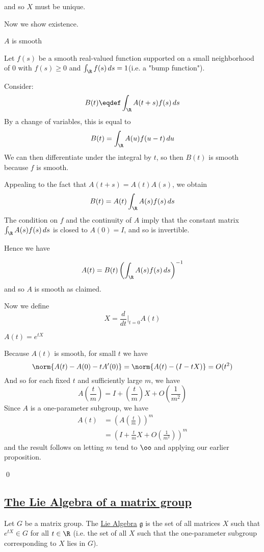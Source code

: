 \documentclass[x11names,reqno,14pt]{extarticle}
\newcommand{\dd}[2]{\frac{d#1}{d#2}}
\begin{document}
and so $X$ must be unique. 

Now we show existence. 

\claim

$A$ is smooth

\proof

Let $f(s)$ be a smooth real-valued function supported on a small neighborhood of 0 with $f(s)\geq0$ and $\int_\R f(s)\,ds = 1$(i.e. a "bump function").

Consider: 
\[
B(t) \eqdef \int_\R A(t + s)f(s)\,ds
\]
By a change of variables, this is equal to 
\[
B(t) = \int_\R A(u)f(u-t)\,du
\]
We can then differentiate under the integral by $t$, so then $B(t)$ is smooth because $f$ is smooth. 

Appealing to the fact that $A(t + s) = A(t)A(s)$, we obtain 
\[
B(t) = A(t)\int_\R A(s)f(s)\,ds
\]
The condition on $f$ and the continuity of $A$ imply that the constant matrix $\int_\R A(s)f(s)\,ds$ is closed to $A(0) = I$, and so is invertible. 

Hence we have

\[
A(t) = B(t)\left(\int_\R A(s)f(s)\,ds\right)^{-1}
\]
and so $A$ is smooth as claimed.

Now we define
\[
X = \dd{}{t}|_{t=0} A(t)
\]

\claim

$A(t) = e^{tX}$

\proof

Because $A(t)$ is smooth, for small $t$ we have
\[
\norm{A(t) - A(0) - tA'(0)} = \norm{A(t) - (I - tX)} = O(t^2)
\]
And so for each fixed $t$ and sufficiently large $m$, we have
\[
A(\frac{t}{m}) = I + (\frac{t}{m})X + O(\frac{1}{m^2})
\]
Since $A$ is a one-parameter subgroup, we have 
\begin{align*}
A(t) & = (A(\frac{t}{m}))^m \\
	  & = (I + \frac{t}{m}X + O(\frac{1}{m^2}))^m
\end{align*}
and the result follows on letting $m$ tend to $\oo$ and applying our earlier proposition.

\qed

\subsection*{\underline{The Lie Algebra of a matrix group}}

Let $G$ be a matrix group. The \underline{Lie Algebra} $\mathfrak{g}$ is the set of all matrices $X$ such that $e^{tX} \in G$ for all $t\in\R$ (i.e. the set of all $X$ such that the one-parameter subgroup corresponding to $X$ lies in $G$).
\end{document}
